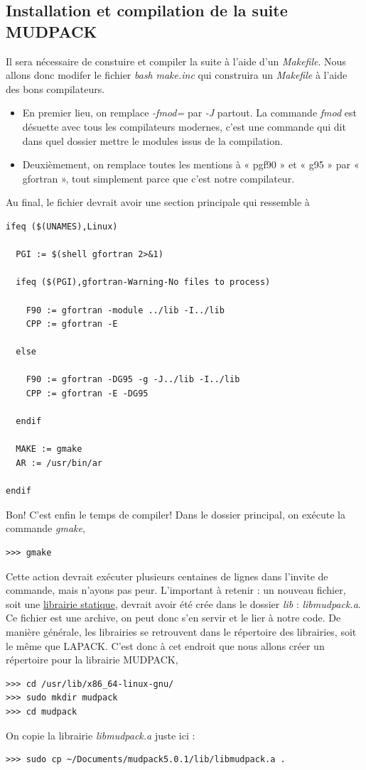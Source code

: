 \documentclass[10pt]{article}
\numberwithin{equation}{section}
\begin{document}
\subsection{Installation et compilation de la suite MUDPACK}
\label{sec:orgc932feb}
Il sera nécessaire de constuire et compiler la suite à l'aide d'un \emph{Makefile}.
Nous allons donc modifer le fichier \emph{bash} \emph{make.inc} qui construira un \emph{Makefile} à l'aide des bons compilateurs.
\begin{itemize}
\item En premier lieu, on remplace \emph{-fmod=} par \emph{-J} partout. La commande \emph{fmod} est désuette avec tous les compilateurs modernes, c'est une commande qui dit dans quel dossier mettre le modules issus de la compilation.
\item Deuxièmement, on remplace toutes les mentions  à « pgf90 » et « g95 » par « gfortran », tout simplement parce que c'est notre compilateur.
\end{itemize}

Au final, le fichier devrait avoir une section principale qui ressemble à

\begin{verbatim}
ifeq ($(UNAMES),Linux)

  PGI := $(shell gfortran 2>&1)

  ifeq ($(PGI),gfortran-Warning-No files to process)

    F90 := gfortran -module ../lib -I../lib
    CPP := gfortran -E

  else

    F90 := gfortran -DG95 -g -J../lib -I../lib 
    CPP := gfortran -E -DG95

  endif

  MAKE := gmake
  AR := /usr/bin/ar

endif
\end{verbatim}

Bon! C'est enfin le temps de compiler! Dans le dossier principal, on exécute la commande \emph{gmake},
\begin{verbatim}
>>> gmake
\end{verbatim}
Cette action devrait exécuter plusieurs centaines de lignes dans l'invite de commande, mais n'ayons pas peur.
L'important à retenir : un nouveau fichier, soit une \href{https://docs.oracle.com/cd/E19957-01/805-4940/6j4m1u7ov/index.html}{librairie statique}, devrait avoir été crée dans le dossier \emph{lib} : \emph{libmudpack.a}.
Ce fichier est une archive, on peut donc s'en servir et le lier à notre code.
De manière générale, les librairies se retrouvent dans le répertoire des librairies, soit le même que LAPACK.
C'est donc à cet endroit que nous allons créer un répertoire pour la librairie MUDPACK,
\begin{verbatim}
>>> cd /usr/lib/x86_64-linux-gnu/
>>> sudo mkdir mudpack
>>> cd mudpack
\end{verbatim}
On copie la librairie \emph{libmudpack.a} juste ici :
\begin{verbatim}
>>> sudo cp ~/Documents/mudpack5.0.1/lib/libmudpack.a .
\end{verbatim}
\end{document}
